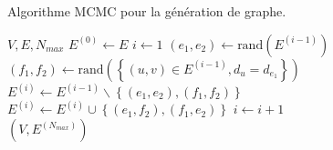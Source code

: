 \documentclass[a4paper]{article}
\begin{document}
    \begin{algorithm}
        \caption{Algorithme MCMC pour la génération de graphe.}
        \label{alg:mcmc_joint}
        \begin{algorithmic}
            \Require $V, E, N_{max}$
            \State $E^{(0)} \gets E$
            \State $i \gets 1$
            \State $(e_1, e_2) \gets \text{rand}(E^{(i-1)})$
            \State $(f_1, f_2) \gets \text{rand}(\left\{ (u, v) \in E^{(i-1)}, d_u = d_{e_1} \right\})$
            \State $E^{(i)} \gets E^{(i-1)} \backslash \left\{ (e_1, e_2), (f_1, f_2) \right\}$
            \State $E^{(i)} \gets E^{(i)} \cup \left\{ (e_1, f_2), (f_1, e_2) \right\}$
            \State $i \gets i + 1$
            \EndWhile \\
            \Return $(V, E^{(N_{max})})$
        \end{algorithmic}
    \end{algorithm}

    
    
\end{document}
